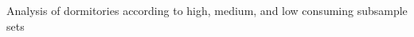 Analysis of dormitories according to high, medium, and low consuming subsample sets
\label{fig:dorms_consbreakdown}